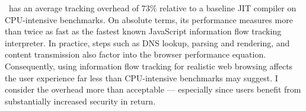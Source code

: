 \JitFlow\ has an average tracking overhead of 73\% relative to a baseline JIT compiler on CPU-intensive benchmarks.
On absolute terms, its performance measures more than twice as fast as the fastest known JavaScript information flow tracking interpreter.
In practice, steps such as DNS lookup, parsing and rendering, and content transmission also factor into the browser performance equation.
Consequently, using information flow tracking for realistic web browsing affects the user experience far less than CPU-intensive benchmarks may suggest.
I consider the overhead more than acceptable --- especially since users benefit from substantially increased security in return.

